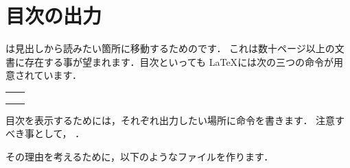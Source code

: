 \section{目次の出力}
は見出しから読みたい箇所に移動するためのです．
これは数十ページ以上の文書に存在する事が望まれます．目次といっても
{\LaTeX}には次の三つの命令が用意されています．

\begin{Syntax}
%
\begin{tabular}{ll}
 \C{tableofcontents} & 
    \pp{\KY{目次} [\Z{Contents}] を出力するための命令}\\
 \C{listoffigures} &
    \pp{\KY{図目次} [\Z{List of Figures}] を出力するための命令}\\
 \C{listoftables} &
    \pp{\KY{表目次} [\Z{List of Tables}] を出力するための命令}
\end{tabular}
\end{Syntax}

目次を表示するためには，それぞれ出力したい場所に命令を書きます．
注意すべき事として，
．

その理由を考えるために，以下のようなファイルを作ります．


